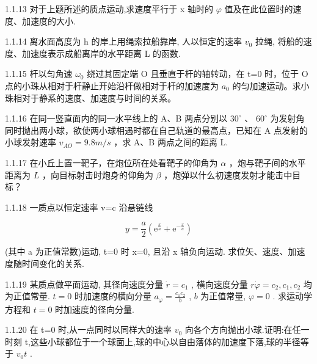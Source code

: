 \begin{problem}{1.1.13}
对于上题所述的质点运动,求速度平行于 x 轴时的 $\varphi$ 值及在此位置时的速度、加速度的大小.
\end{problem}
\clearpage


\begin{problem}{1.1.14}
离水面高度为 h 的岸上用绳索拉船靠岸, 人以恒定的速率 $v_{0}$ 拉绳, 将船的速度、加速度表示成船离岸的水平距离 L 的函数.
\end{problem}
\clearpage


\begin{problem}{1.1.15}
杆以匀角速 $\omega_{0}$ 绕过其固定端 O 且垂直于杆的轴转动，在 t=0 时，位于 O 点的小珠从相对于杆静止开始沿杆做相对于杆的加速度为 $a_{0}$ 的匀加速运动。求小珠相对于静系的速度、加速度与时间的关系。
\end{problem}
\clearpage


\begin{problem}{1.1.16}
在同一竖直面内的同一水平线上的 A、B 两点分别以 $30^{\circ}$ 、 $60^{\circ}$ 为发射角同时抛出两小球，欲使两小球相遇时都在自己轨道的最高点，已知在 A 点发射的小球发射速率 $v_{AO}=9.8m/s$ ，求 A、B 两点之间的距离 L.
\end{problem}
\clearpage


\begin{problem}{1.1.17}
在小丘上置一靶子，在炮位所在处看靶子的仰角为 $\alpha$ ，炮与靶子间的水平距离为 $L$ ，向目标射击时炮身的仰角为 $\beta$ ，炮弹以什么初速度发射才能击中目标？
\end{problem}
\clearpage


\begin{problem}{1.1.18}
一质点以恒定速率 v=c 沿悬链线

\[
y = \frac {a}{2} \left(\mathrm{e} ^ {\frac {x}{a}} + \mathrm{e} ^ {- \frac {x}{a}}\right)
\]

(其中 a 为正值常数)运动, t=0 时 x=0, 且沿 x 轴负向运动. 求位矢、速度、加速度随时间变化的关系.
\end{problem}
\clearpage


\begin{problem}{1.1.19}
某质点做平面运动, 其径向速度分量 $\dot{r} = c_{1}$ , 横向速度分量 $r\dot{\varphi} = c_{2}, c_{1}, c_{2}$ 均为正值常量. $t = 0$ 时加速度的横向分量 $a_{\varphi} = \frac{c_{1}c_{2}}{b}$ , $b$ 为正值常量, $\varphi = 0$ . 求运动学方程和 $t = 0$ 时加速度的径向分量.
\end{problem}
\clearpage


\begin{problem}{1.1.20}
在 t=0 时,从一点同时以同样大的速率 $v_{0}$ 向各个方向抛出小球.证明:在任一时刻 t,这些小球都位于一个球面上,球的中心以自由落体的加速度下落,球的半径等于 $v_{0}t$ .
\end{problem}
\clearpage


